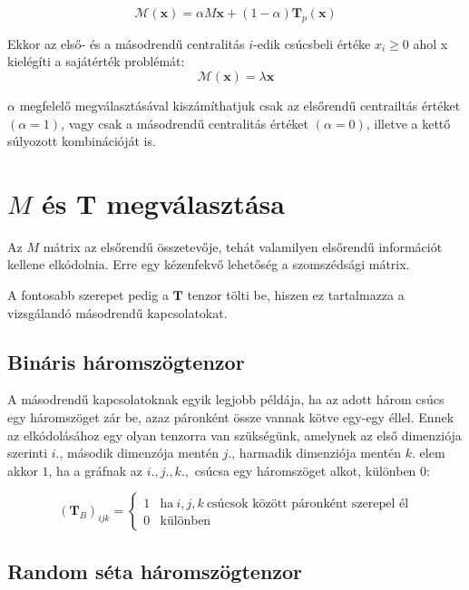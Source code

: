\documentclass[12pt,numbers=noenddot]{report}
\begin{document}
$$\mathcal{M}(\boldsymbol{x}) = \alpha M \boldsymbol{x} + (1-\alpha) 
\boldsymbol{T}_p(\boldsymbol{x})$$

\noindent
Ekkor az első- és a másodrendű centralitás $i$-edik csúcsbeli értéke $x_i 
\geq 0$ ahol x kielégíti a sajátérték problémát:
$$\mathcal{M}(\boldsymbol{x}) = \lambda \boldsymbol{x}$$

\noindent
$\alpha$ megfelelő megválasztásával kiszámíthatjuk csak az elsőrendű 
centrailtás értéket $(\alpha = 1)$, vagy csak a másodrendű centralitás 
értéket $(\alpha = 0)$, illetve a kettő súlyozott kombinációját is.


\section{$M$ és $\boldsymbol{T}$ megválasztása}

Az $M$ mátrix az elsőrendű összetevője, tehát valamilyen elsőrendű 
információt kellene elkódolnia. 
Erre egy kézenfekvő lehetőség a szomszédsági mátrix.

A fontosabb szerepet pedig a $\boldsymbol{T}$ tenzor tölti be, hiszen ez 
tartalmazza a vizsgálandó másodrendű kapcsolatokat.

\subsection*{Bináris háromszögtenzor}

A másodrendű kapcsolatoknak egyik legjobb példája, ha az adott három csúcs egy
háromszöget zár be, azaz páronként össze vannak kötve egy-egy éllel.
Ennek az elkódolásához egy olyan tenzorra van szükségünk, amelynek az első 
dimenziója szerinti $i.$, második dimenzója mentén $j.$, harmadik dimenziója
mentén $k.$ elem akkor $1$, ha a gráfnak az $i., j., k.,$ csúcsa egy háromszöget
alkot, különben $0$:

\begin{equation}
	(\boldsymbol{T}_B)_{ijk} = 
		\begin{cases}
			1 & \text{ha} ~ i, j, k ~ \text{csúcsok között páronként szerepel él} \\
			0 & \text{különben}
		\end{cases}
\end{equation}

\pagebreak

\subsection*{Random séta háromszögtenzor}
\end{document}

